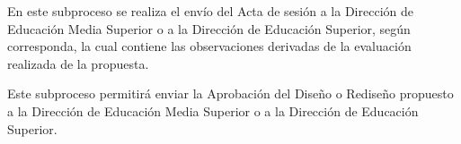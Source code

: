 \begin{PDescripcion}
\begin{enumerate}
			\Ppaso[\PSubProceso]  En este subproceso se realiza el envío del Acta de sesión a la Dirección de Educación Media Superior o a la Dirección de Educación Superior, según corresponda, la cual contiene las observaciones derivadas de la evaluación realizada de la propuesta.
	
			\Ppaso[\PSubProceso]  Este subproceso permitirá enviar la Aprobación del Diseño o Rediseño propuesto a la Dirección de Educación Media Superior o a la Dirección de Educación Superior.
	
		\end{enumerate}

\end{PDescripcion}
